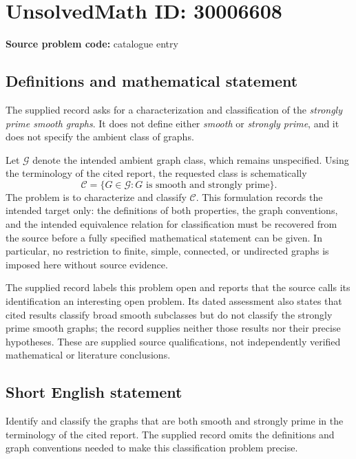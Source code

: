 \documentclass[11pt]{article}
\begin{document}
\section*{UnsolvedMath ID: 30006608}
\textbf{Source problem code:} catalogue entry
\subsection{Definitions and mathematical statement}
The supplied record asks for a characterization and classification of the \emph{strongly prime smooth graphs}. It does not define either \emph{smooth} or \emph{strongly prime}, and it does not specify the ambient class of graphs.

Let \(\mathcal G\) denote the intended ambient graph class, which remains unspecified. Using the terminology of the cited report, the requested class is schematically
\[
\mathcal C=\{G\in\mathcal G: G\text{ is smooth and strongly prime}\}.
\]
The problem is to characterize and classify \(\mathcal C\). This formulation records the intended target only: the definitions of both properties, the graph conventions, and the intended equivalence relation for classification must be recovered from the source before a fully specified mathematical statement can be given. In particular, no restriction to finite, simple, connected, or undirected graphs is imposed here without source evidence.

The supplied record labels this problem open and reports that the source calls its identification an interesting open problem. Its dated assessment also states that cited results classify broad smooth subclasses but do not classify the strongly prime smooth graphs; the record supplies neither those results nor their precise hypotheses. These are supplied source qualifications, not independently verified mathematical or literature conclusions.
\subsection{Short English statement}
Identify and classify the graphs that are both smooth and strongly prime in the terminology of the cited report. The supplied record omits the definitions and graph conventions needed to make this classification problem precise.
\end{document}
